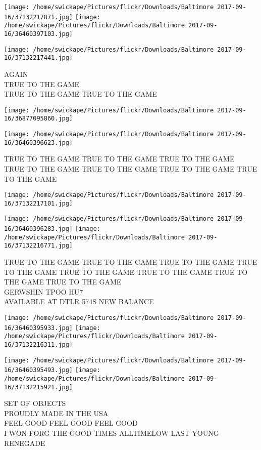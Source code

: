 \documentclass[10pt,letterpaper]{article}
\begin{document}
\texttt{[image: /home/swickape/Pictures/flickr/Downloads/Baltimore 2017-09-16/37132217871.jpg]}
\texttt{[image: /home/swickape/Pictures/flickr/Downloads/Baltimore 2017-09-16/36460397103.jpg]}

\texttt{[image: /home/swickape/Pictures/flickr/Downloads/Baltimore 2017-09-16/37132217441.jpg]}

AGAIN\\
TRUE TO THE GAME\\
TRUE TO THE GAME TRUE TO THE GAME
\pagebreak

\texttt{[image: /home/swickape/Pictures/flickr/Downloads/Baltimore 2017-09-16/36877095860.jpg]}

\vspace{0.25in}
\texttt{[image: /home/swickape/Pictures/flickr/Downloads/Baltimore 2017-09-16/36460396623.jpg]}

TRUE TO THE GAME TRUE TO THE GAME TRUE TO THE GAME\\
TRUE TO THE GAME TRUE TO THE GAME TRUE TO THE GAME TRUE TO THE GAME
\pagebreak

\texttt{[image: /home/swickape/Pictures/flickr/Downloads/Baltimore 2017-09-16/37132217101.jpg]}

\vspace{0.25in}
\texttt{[image: /home/swickape/Pictures/flickr/Downloads/Baltimore 2017-09-16/36460396283.jpg]}
\texttt{[image: /home/swickape/Pictures/flickr/Downloads/Baltimore 2017-09-16/37132216771.jpg]}

TRUE TO THE GAME TRUE TO THE GAME TRUE TO THE GAME TRUE TO THE GAME TRUE TO THE GAME TRUE TO THE GAME TRUE TO THE GAME TRUE TO THE GAME\\
GERWSHIN TPOO HU7\\
AVAILABLE AT DTLR 574S NEW BALANCE
\pagebreak

\texttt{[image: /home/swickape/Pictures/flickr/Downloads/Baltimore 2017-09-16/36460395933.jpg]}
\texttt{[image: /home/swickape/Pictures/flickr/Downloads/Baltimore 2017-09-16/37132216311.jpg]}

\texttt{[image: /home/swickape/Pictures/flickr/Downloads/Baltimore 2017-09-16/36460395493.jpg]}
\texttt{[image: /home/swickape/Pictures/flickr/Downloads/Baltimore 2017-09-16/37132215921.jpg]}

SET OF OBJECTS\\
PROUDLY MADE IN THE USA\\
FEEL GOOD FEEL GOOD FEEL GOOD\\
I WON FORG THE GOOD TIMES ALLTIMELOW LAST YOUNG RENEGADE
\pagebreak
\end{document}
